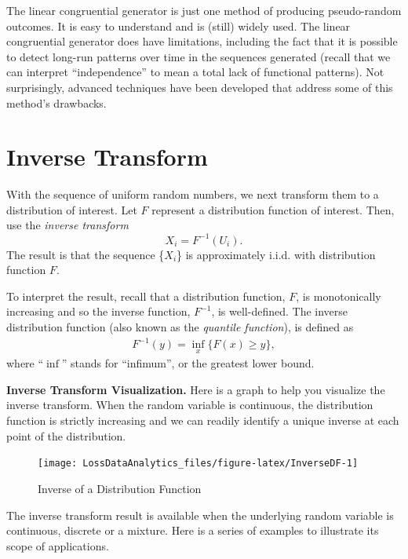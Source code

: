 \documentclass[]{book}
\begin{document}
The linear congruential generator is just one method of producing
pseudo-random outcomes. It is easy to understand and is (still) widely
used. The linear congruential generator does have limitations, including
the fact that it is possible to detect long-run patterns over time in
the sequences generated (recall that we can interpret ``independence''
to mean a total lack of functional patterns). Not surprisingly, advanced
techniques have been developed that address some of this method's
drawbacks.

\section{Inverse Transform}\label{inverse-transform}

With the sequence of uniform random numbers, we next transform them to a
distribution of interest. Let \(F\) represent a distribution function of
interest. Then, use the \emph{inverse transform}
\[X_i=F^{-1}\left( U_i \right) .\] The result is that the sequence
\{\(X_{i}\)\} is approximately i.i.d. with distribution function \(F\).

To interpret the result, recall that a distribution function, \(F\), is
monotonically increasing and so the inverse function, \(F^{-1}\), is
well-defined. The inverse distribution function (also known as the
\emph{quantile function}), is defined as \[\begin{aligned}
F^{-1}(y) = \inf_x \{ F(x) \ge y \} ,\end{aligned}\] where ``\(\inf\)''
stands for ``infimum'', or the greatest lower bound.

\textbf{Inverse Transform Visualization.} Here is a graph to help you
visualize the inverse transform. When the random variable is continuous,
the distribution function is strictly increasing and we can readily
identify a unique inverse at each point of the distribution.

\begin{figure}

{\centering \texttt{[image: LossDataAnalytics\_files/figure-latex/InverseDF-1]} 

}

\caption{Inverse of a Distribution Function}\label{fig:InverseDF}
\end{figure}

The inverse transform result is available when the underlying random
variable is continuous, discrete or a mixture. Here is a series of
examples to illustrate its scope of applications.
\end{document}
